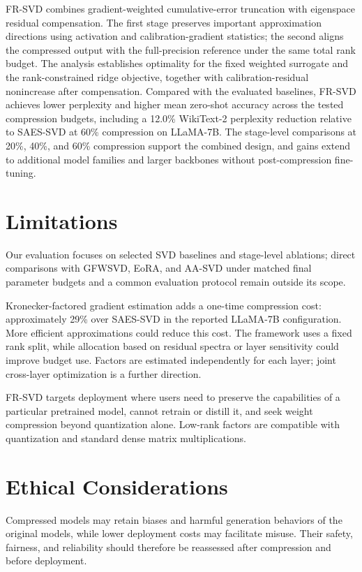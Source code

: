\documentclass[11pt]{article}
\begin{document}
FR-SVD combines gradient-weighted cumulative-error truncation with eigenspace residual compensation. The first stage preserves important approximation directions using activation and calibration-gradient statistics; the second aligns the compressed output with the full-precision reference under the same total rank budget. The analysis establishes optimality for the fixed weighted surrogate and the rank-constrained ridge objective, together with calibration-residual nonincrease after compensation. Compared with the evaluated baselines, FR-SVD achieves lower perplexity and higher mean zero-shot accuracy across the tested compression budgets, including a 12.0\% WikiText-2 perplexity reduction relative to SAES-SVD at 60\% compression on LLaMA-7B. The stage-level comparisons at 20\%, 40\%, and 60\% compression support the combined design, and gains extend to additional model families and larger backbones without post-compression fine-tuning.
\FloatBarrier
\label{main:end}

\section*{Limitations}

Our evaluation focuses on selected SVD baselines and stage-level ablations; direct comparisons with GFWSVD, EoRA, and AA-SVD under matched final parameter budgets and a common evaluation protocol remain outside its scope.

Kronecker-factored gradient estimation adds a one-time compression cost: approximately 29\% over SAES-SVD in the reported LLaMA-7B configuration. More efficient approximations could reduce this cost. The framework uses a fixed rank split, while allocation based on residual spectra or layer sensitivity could improve budget use. Factors are estimated independently for each layer; joint cross-layer optimization is a further direction.

FR-SVD targets deployment where users need to preserve the capabilities of a particular pretrained model, cannot retrain or distill it, and seek weight compression beyond quantization alone. Low-rank factors are compatible with quantization and standard dense matrix multiplications.

\section*{Ethical Considerations}

Compressed models may retain biases and harmful generation behaviors of the original models, while lower deployment costs may facilitate misuse. Their safety, fairness, and reliability should therefore be reassessed after compression and before deployment.


\clearpage
\appendix

\end{document}
